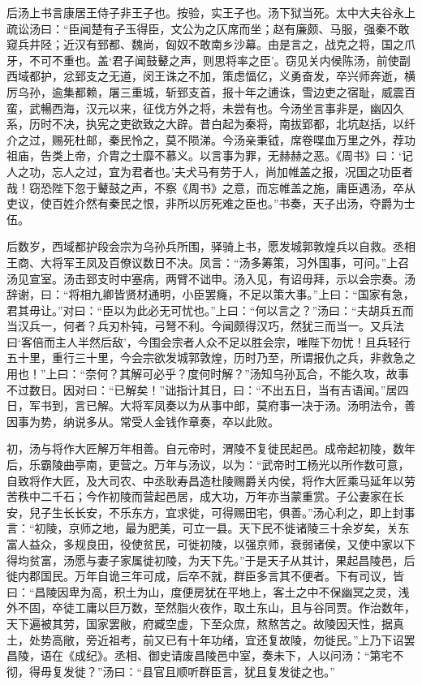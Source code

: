 \documentclass[12pt,UTF8]{ctexbook}
\begin{document}
后汤上书言康居王侍子非王子也。按验，实王子也。汤下狱当死。太中大夫谷永上疏讼汤曰：“臣闻楚有子玉得臣，文公为之仄席而坐；赵有廉颇、马服，强秦不敢窥兵井陉；近汉有郅都、魏尚，匈奴不敢南乡沙幕。由是言之，战克之将，国之爪牙，不可不重也。盖‘君子闻鼓鼙之声，则思将率之臣’。窃见关内侯陈汤，前使副西域都护，忿郅支之无道，闵王诛之不加，策虑愊亿，义勇奋发，卒兴师奔逝，横厉乌孙，逾集都赖，屠三重城，斩郅支首，报十年之逋诛，雪边吏之宿耻，威震百蛮，武暢西海，汉元以来，征伐方外之将，未尝有也。今汤坐言事非是，幽囚久系，历时不决，执宪之吏欲致之大辟。昔白起为秦将，南拔郢都，北坑赵括，以纤介之过，赐死杜邮，秦民怜之，莫不陨涕。今汤亲秉钺，席卷喋血万里之外，荐功祖庙，告类上帝，介胄之士靡不慕义。以言事为罪，无赫赫之恶。《周书》曰：‘记人之功，忘人之过，宜为君者也。’夫犬马有劳于人，尚加帷盖之报，况国之功臣者哉！窃恐陛下忽于鼙鼓之声，不察《周书》之意，而忘帷盖之施，庸臣遇汤，卒从吏议，使百姓介然有秦民之恨，非所以厉死难之臣也。”书奏，天子出汤，夺爵为士伍。



后数岁，西域都护段会宗为乌孙兵所围，驿骑上书，愿发城郭敦煌兵以自救。丞相王商、大将军王凤及百僚议数日不决。凤言：“汤多筹策，习外国事，可问。”上召汤见宣室。汤击郅支时中塞病，两臂不诎申。汤入见，有诏毋拜，示以会宗奏。汤辞谢，曰：“将相九卿皆贤材通明，小臣罢癃，不足以策大事。”上曰：“国家有急，君其毋让。”对曰：“臣以为此必无可忧也。”上曰：“何以言之？”汤曰：“夫胡兵五而当汉兵一，何者？兵刃朴钝，弓弩不利。今闻颇得汉巧，然犹三而当一。又兵法曰‘客倍而主人半然后敌’，今围会宗者人众不足以胜会宗，唯陛下勿忧！且兵轻行五十里，重行三十里，今会宗欲发城郭敦煌，历时乃至，所谓报仇之兵，非救急之用也！”上曰：“奈何？其解可必乎？度何时解？”汤知乌孙瓦合，不能久攻，故事不过数日。因对曰：“已解矣！”诎指计其日，曰：“不出五日，当有吉语闻。”居四日，军书到，言已解。大将军凤奏以为从事中郎，莫府事一决于汤。汤明法令，善因事为势，纳说多从。常受人金钱作章奏，卒以此败。



初，汤与将作大匠解万年相善。自元帝时，渭陵不复徙民起邑。成帝起初陵，数年后，乐霸陵曲亭南，更营之。万年与汤议，以为：“武帝时工杨光以所作数可意，自致将作大匠，及大司农、中丞耿寿昌造杜陵赐爵关内侯，将作大匠乘马延年以劳苦秩中二千石；今作初陵而营起邑居，成大功，万年亦当蒙重赏。子公妻家在长安，兒子生长长安，不乐东方，宜求徙，可得赐田宅，俱善。”汤心利之，即上封事言：“初陵，京师之地，最为肥美，可立一县。天下民不徙诸陵三十余岁矣，关东富人益众，多规良田，役使贫民，可徙初陵，以强京师，衰弱诸侯，又使中家以下得均贫富，汤愿与妻子家属徙初陵，为天下先。”于是天子从其计，果起昌陵邑，后徙内郡国民。万年自诡三年可成，后卒不就，群臣多言其不便者。下有司议，皆曰：“昌陵因卑为高，积土为山，度便房犹在平地上，客土之中不保幽冥之灵，浅外不固，卒徒工庸以巨万数，至然脂火夜作，取土东山，且与谷同贾。作治数年，天下遍被其劳，国家罢敝，府臧空虚，下至众庶，熬熬苦之。故陵因天性，据真土，处势高敞，旁近祖考，前又已有十年功绪，宜还复故陵，勿徙民。”上乃下诏罢昌陵，语在《成纪》。丞相、御史请废昌陵邑中室，奏未下，人以问汤：“第宅不彻，得毋复发徙？”汤曰：“县官且顺听群臣言，犹且复发徙之也。”
\end{document}

